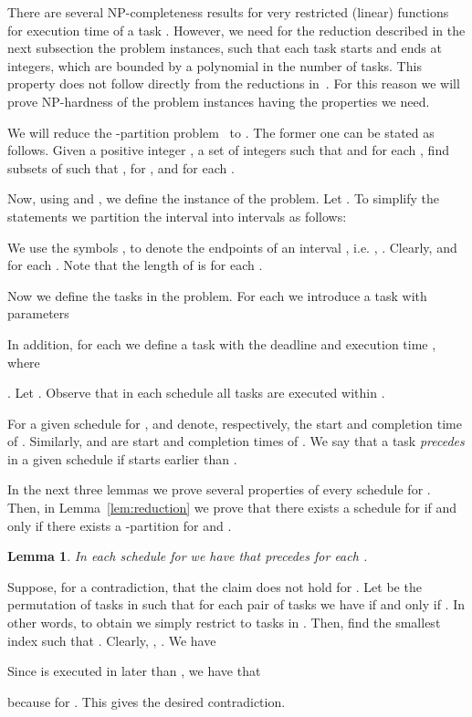 \documentclass[10pt]{article}
\newenvironment{proof}[1][Proof]
{\par\noindent{\bf #1:} }{\hspace*{\fill}\nolinebreak{}\bigskip\par}
\newtheorem{lemma}{Lemma}
\begin{document}
There are several NP-completeness results for very restricted (linear) functions for execution time of a task \cite{ChengDing03,Kubiak_deteriorating}. However, we need for the reduction described in the next subsection the  problem instances, such that each task starts and ends at integers, which are bounded by a polynomial in the number of tasks. This property does not follow directly from the reductions in~\cite{ChengDing03,Kubiak_deteriorating}. For this reason we will prove NP-hardness of the  problem instances having the properties we need.

We will reduce the -partition problem~\cite{GareyJohnson79} to . The former one can be stated as follows. Given a positive integer , a set of integers  such that  and  for each , find subsets  of  such that ,  for , and  for each .

Now, using  and , we define the instance of the  problem. Let . To simplify the statements we partition the interval  into intervals  as follows:

We use the symbols ,  to denote the endpoints of an interval , i.e. , .
Clearly,  and  for each . Note that the length of  is  for each .

Now we define the tasks in the  problem. For each  we introduce a task  with parameters

In addition, for each  we define a task  with the deadline  and execution time , where

. Let . Observe that in each schedule all tasks are executed within .

For a given schedule  for ,  and  denote, respectively, the start and completion time of . Similarly,  and  are start and completion times of . We say that a task  \emph{precedes}  in a given schedule if  starts earlier than .

In the next three lemmas we prove several properties of every schedule for . Then, in Lemma~\ref{lem:reduction} we prove that there exists a schedule for  if and only if there exists a -partition for  and .

\begin{lemma} \label{lem:preceeding}
In each schedule  for  we have that  precedes  for each .
\end{lemma}
\begin{proof}
Suppose, for a contradiction, that the claim does not hold for . Let  be the permutation of tasks in  such that for each pair of tasks  we have  if and only if . In other words, to obtain  we simply restrict  to tasks in . Then, find the smallest index  such that . Clearly, , . We have

Since  is executed in  later than , we have that

because  for . This gives the desired contradiction.
\end{proof}
\end{document}

